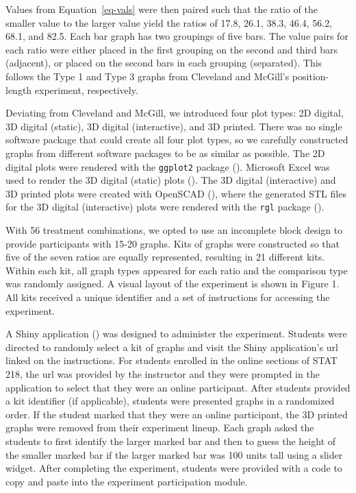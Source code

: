 \documentclass[
]{article}
\begin{document}
Values from Equation~\ref{eq-vals} were then paired such that the ratio
of the smaller value to the larger value yield the ratios of 17.8, 26.1,
38.3, 46.4, 56.2, 68.1, and 82.5. Each bar graph has two groupings of
five bars. The value pairs for each ratio were either placed in the
first grouping on the second and third bars (adjacent), or placed on the
second bars in each grouping (separated). This follows the Type 1 and
Type 3 graphs from Cleveland and McGill's position-length experiment,
respectively.

Deviating from Cleveland and McGill, we introduced four plot types: 2D
digital, 3D digital (static), 3D digital (interactive), and 3D printed.
There was no single software package that could create all four plot
types, so we carefully constructed graphs from different software
packages to be as similar as possible. The 2D digital plots were
rendered with the \texttt{ggplot2} package
(). Microsoft Excel was used to
render the 3D digital (static) plots (). The 3D digital (interactive) and 3D printed plots
were created with OpenSCAD
(), where the
generated STL files for the 3D digital (interactive) plots were rendered
with the \texttt{rgl} package ().

With 56 treatment combinations, we opted to use an incomplete block
design to provide participants with 15-20 graphs. Kits of graphs were
constructed so that five of the seven ratios are equally represented,
resulting in 21 different kits. Within each kit, all graph types
appeared for each ratio and the comparison type was randomly assigned. A
visual layout of the experiment is shown in Figure 1. All kits received
a unique identifier and a set of instructions for accessing the
experiment.

A Shiny application () was
designed to administer the experiment. Students were directed to
randomly select a kit of graphs and visit the Shiny application's url
linked on the instructions. For students enrolled in the online sections
of STAT 218, the url was provided by the instructor and they were
prompted in the application to select that they were an online
participant. After students provided a kit identifier (if applicable),
students were presented graphs in a randomized order. If the student
marked that they were an online participant, the 3D printed graphs were
removed from their experiment lineup. Each graph asked the students to
first identify the larger marked bar and then to guess the height of the
smaller marked bar if the larger marked bar was 100 units tall using a
slider widget. After completing the experiment, students were provided
with a code to copy and paste into the experiment participation module.
\end{document}
